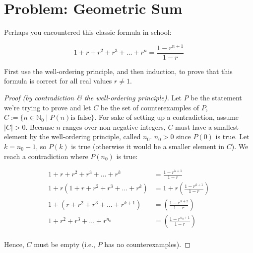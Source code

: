 \documentclass[a4paper]{article}
\begin{document}
\section{Problem: Geometric Sum}%
\label{sec:Problem: Geometric Sum}

Perhaps you encountered this classic formula in school:

\begin{equation*}
	1 + r + r^{2} + r^{3} + \ldots + r^{n} = \frac{1 - r^{n+1}}{1-r}
\end{equation*}

\noindent
First use the well-ordering principle, and then induction, to prove that this
formula is correct for all real values $r \neq 1$.

\begin{proof}[Proof (by contradiction \& the well-ordering principle)]

	Let $P$ be the statement we're trying to prove and let $C$ be the set of
	counterexamples of $P$, $C := \lbrace n \in \mathbb{N}_{0} \mid P(n) \text{
	is false}\rbrace$. For sake of setting up a contradiction, assume $|C| > 0$.
	Because $n$ ranges over non-negative integers, $C$ must have a smallest
	element by the well-ordering principle, called $n_{0}$. $n_{0} > 0$ since
	$P(0)$ is true. Let $k = n_{0} - 1$, so $P(k)$ is true (otherwise it would be
	a smaller element in $C$). We reach a contradiction where $P(n_{0})$ is true:

	\begin{align*}
	1 + r + r^{2} + r^{3} + \ldots + r^{k} &=  \frac{1 - r^{k + 1}}{1 - r}\\
		1 + r \left(1 + r + r^{2} + r^{3} + \ldots + r^{k} \right) &= 1 + r \left(\frac{1 - r^{k + 1}}{1 - r}\right)\\
		1 + \left(r + r^{2} + r^{3} + \ldots + r^{k+1}\right) &= \left(\frac{1 - r^{k + 2}}{1 - r}\right)\\
		1 + r^{2} + r^{3} + \ldots + r^{n_{0}} &= \left(\frac{1 - r^{n_{0} + 1}}{1 - r}\right)\\
	\end{align*}

	Hence, $C$ must be empty (i.e., $P$ has no counterexamples).
\end{proof}
\end{document}
